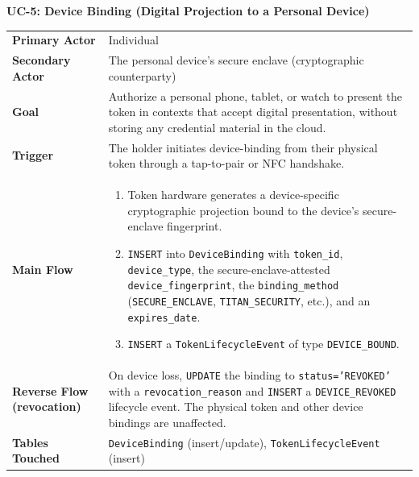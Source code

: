 \documentclass[11pt,letterpaper]{article}
\newcommand{\entity}[1]{\texttt{\color{navydark}#1}}
\newcommand{\usecase}[2]{%
  \needspace{3\baselineskip}%
  \vspace{6pt}%
  \noindent\colorbox{tabheader}{\parbox{\dimexpr\textwidth-2\fboxsep}{%
    \color{white}\small\bfseries\textsc{#1:} \mdseries #2}}%
  \nopagebreak[4]%
  \vspace{2pt}%
  \nopagebreak[4]%
}
\begin{document}
\usecase{UC-5}{Device Binding (Digital Projection to a Personal Device)}
\noindent\begin{xltabular}{\textwidth}{>{\bfseries}p{1.4in} >{\RaggedRight\arraybackslash}X}
Primary Actor & Individual \\
Secondary Actor & The personal device's secure enclave (cryptographic counterparty) \\
Goal & Authorize a personal phone, tablet, or watch to present the token in contexts that accept digital presentation, without storing any credential material in the cloud. \\
Trigger & The holder initiates device-binding from their physical token through a tap-to-pair or NFC handshake. \\
Main Flow &
\begin{enumerate}
  \item Token hardware generates a device-specific cryptographic projection bound to the device's secure-enclave fingerprint.
  \item \texttt{INSERT} into \entity{DeviceBinding} with \texttt{token\_id}, \texttt{device\_type}, the secure-enclave-attested \texttt{device\_fingerprint}, the \texttt{binding\_method} (\texttt{SECURE\_ENCLAVE}, \texttt{TITAN\_SECURITY}, etc.), and an \texttt{expires\_date}.
  \item \texttt{INSERT} a \entity{TokenLifecycleEvent} of type \texttt{DEVICE\_BOUND}.
\end{enumerate} \\
Reverse Flow (revocation) & On device loss, \texttt{UPDATE} the binding to \texttt{status='REVOKED'} with a \texttt{revocation\_reason} and \texttt{INSERT} a \texttt{DEVICE\_REVOKED} lifecycle event. The physical token and other device bindings are unaffected. \\
Tables Touched & \entity{DeviceBinding} (insert/update), \entity{TokenLifecycleEvent} (insert) \\
\end{xltabular}
\end{document}
